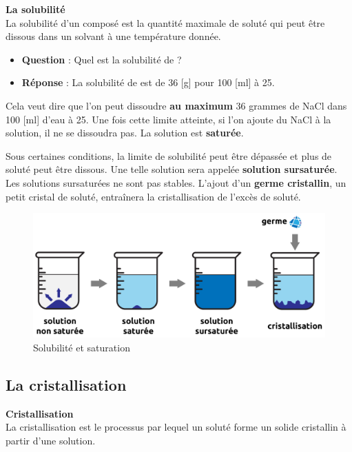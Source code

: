 \documentclass[
  11pt,
  a4paper,
  openany]{book}
\providecommand{\tightlist}{%
  \setlength{\itemsep}{0pt}\setlength{\parskip}{0pt}}
\begin{document}
\begin{tcolorbox}
\textbf{La solubilité}\\
La solubilité d'un composé est la quantité maximale de soluté qui peut être dissous dans un solvant à une température donnée.

\end{tcolorbox}

\begin{itemize}
\tightlist
\item
  \textbf{Question} : Quel est la solubilité de ?
\item
  \textbf{Réponse} : La solubilité de  est de 36 {[}g{]} pour 100 {[}ml{]} à 25\celsius.
\end{itemize}

Cela veut dire que l'on peut dissoudre \textbf{au maximum} 36 grammes de NaCl dans 100 {[}ml{]} d'eau à 25\celsius. Une fois cette limite atteinte, si l'on ajoute du NaCl à la solution, il ne se dissoudra pas. La solution est \textbf{saturée}.

Sous certaines conditions, la limite de solubilité peut être dépassée et plus de soluté peut être dissous. Une telle solution sera appelée \textbf{solution sursaturée}. Les solutions sursaturées ne sont pas stables. L'ajout d'un \textbf{germe cristallin}, un petit cristal de soluté, entraînera la cristallisation de l'excès de soluté.

\begin{figure}

{\centering \includegraphics[width=0.67\linewidth]{images/solution} 

}

\caption{Solubilité et saturation}\label{fig:solubilite-saturation}
\end{figure}

\hypertarget{la-cristallisation}{%
\subsection{La cristallisation}\label{la-cristallisation}}

\begin{tcolorbox}
\textbf{Cristallisation}\\
La cristallisation est le processus par lequel un soluté forme un solide cristallin à partir d'une solution.

\end{tcolorbox}
\end{document}

